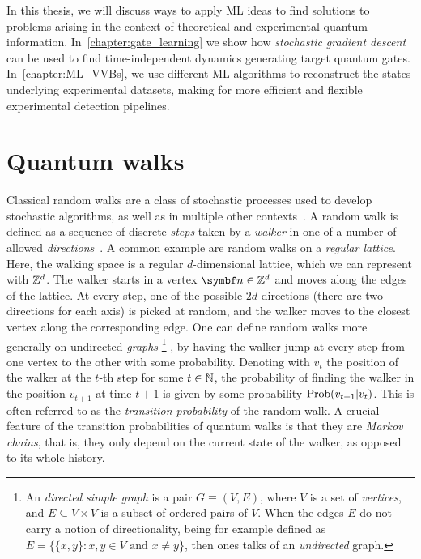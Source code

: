 In this thesis, we will discuss ways to apply ML ideas to find solutions to problems arising in the context of theoretical and experimental quantum information.
In~\cref{chapter:gate_learning} we show how \emph{stochastic gradient descent} can be used to find time-independent dynamics generating target quantum gates.
In~\cref{chapter:ML_VVBs}, we use different ML algorithms to reconstruct the states underlying experimental datasets, making for more efficient and flexible experimental detection pipelines.


\section{Quantum walks}
\label{sec:intro:QWs}



Classical random walks are a class of stochastic processes used to develop stochastic algorithms, as well as in multiple other contexts~\cite{berg1993random,fama1995random,motwani1995randomized,hughes1996random,schoning1999probabilistic,codling2008random}.
A random walk is defined as a sequence of discrete \textit{steps} taken by a \textit{walker} in one of a number of allowed \emph{directions}~\cite{lovasz1993random}.
A common example are random walks on a \textit{regular lattice}. Here, the walking space is a regular $d$-dimensional lattice, which we can represent with ${\mathbb{Z}}^d$. The walker starts in a vertex $\bs n\in\ZZ^d$ and moves along the edges of the lattice.
At every step, one of the possible $2d$ directions (there are two directions for each axis) is picked at random, and the walker moves to the closest vertex along the corresponding edge.
One can define random walks more generally on undirected \textit{graphs}
\footnote{An \textit{directed simple graph} is a pair $G\equiv (V,E)$, where $V$ is a set of \textit{vertices}, and $E\subseteq V\times V$ is a subset of ordered pairs of $V$. When the edges $E$ do not carry a notion of directionality, being for example defined as $E=\{\{x,y\} : x,y\in V\text{ and }x\neq y\}$, then ones talks of an \textit{undirected} graph.}
, by having the walker jump at every step from one vertex to the other with some probability.
Denoting with $v_t$ the position of the walker at the $t$-th step for some $t\in{\mathbb{N}}$, the probability of finding the walker in the position $v_{t+1}$ at time $t+1$ is given by some probability $\operatorname*{Prob}(v_{t+1}|v_{t})$. This is often referred to as the \emph{transition probability} of the random walk. 
A crucial feature of the transition probabilities of quantum walks is that they are \emph{Markov chains}, that is, they only depend on the current state of the walker, as opposed to its whole history. 

